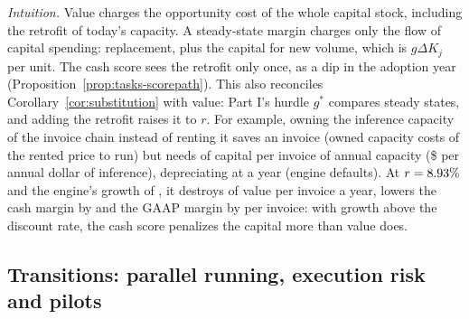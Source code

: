 \noindent\emph{Intuition.} Value charges the opportunity cost of the whole capital stock, including the retrofit of today's capacity. A steady-state margin charges only the flow of capital spending: replacement, plus the capital for new volume, which is $g\Delta K_j$ per unit. The cash score sees the retrofit only once, as a dip in the adoption year (Proposition~\ref{prop:tasks-scorepath}). This also reconciles Corollary~\ref{cor:substitution} with value: Part I's hurdle $g^*$ compares steady states, and adding the retrofit raises it to $r$. For example, owning the inference capacity of the invoice chain instead of renting it saves \icCapDc{} an invoice (owned capacity costs \icOwnedOpex{} of the rented price to run) but needs \icCapDK{} of capital per invoice of annual capacity (\$\icCapPerDollar{} per annual dollar of inference), depreciating at \icDeltaKcompute{} a year (engine defaults). At $r=8.93\%$ and the engine's growth of \icCapG, it destroys \icCapValue{} of value per invoice a year, lowers the cash margin by \icCapCash{} and the GAAP margin by \icCapGaap{} per invoice: with growth above the discount rate, the cash score penalizes the capital more than value does.

\subsection{Transitions: parallel running, execution risk and pilots}\label{sec:tasks-transition}

